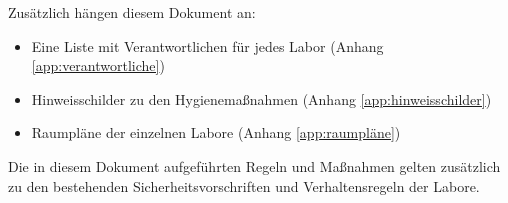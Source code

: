 {\bigskip
\noindent
Zusätzlich hängen diesem Dokument an:

\begin{itemize}
    \item Eine Liste mit Verantwortlichen für jedes Labor (Anhang \ref{app:verantwortliche})
    \item Hinweisschilder zu den Hygienemaßnahmen (Anhang \ref{app:hinweisschilder})
    \item Raumpläne der einzelnen Labore (Anhang \ref{app:raumpläne})
\end{itemize}

\bigskip
\noindent
Die in diesem Dokument aufgeführten Regeln und Maßnahmen gelten zusätzlich zu den bestehenden Sicherheitsvorschriften und Verhaltensregeln der Labore.
}
